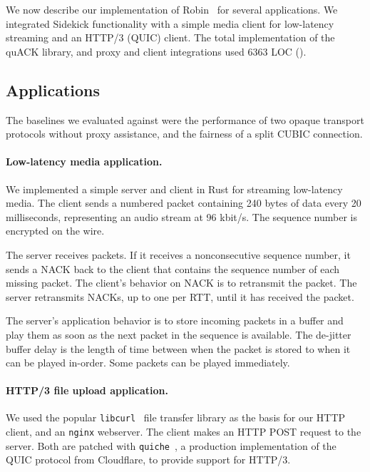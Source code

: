 

We now describe our implementation of Robin~\cite{sidekick-github} for several applications.
We integrated Sidekick functionality with a simple media client for low-latency streaming
and an HTTP/3 (QUIC) client.
The total implementation of the quACK library, and proxy and client
integrations used 6363 LOC ().

\subsection{Applications}
\label{sec:sidekick:implementation:applications}

The baselines we evaluated against were the performance of two opaque transport
protocols without proxy assistance, and the fairness of a split CUBIC connection.

\paragraph{Low-latency media application.}
We implemented a simple server and client in Rust for streaming low-latency
media. The client sends a numbered packet containing 240 bytes of data every
20 milliseconds, representing an audio stream at 96 kbit/s.
The sequence number is encrypted on the wire.

The server receives packets. If it receives a nonconsecutive sequence number,
it sends a NACK back to the client that contains the sequence number of each
missing packet. The client's behavior on NACK is to retransmit the packet. The
server retransmits NACKs, up to one per RTT, until it has received the packet.

The server's application behavior is to store incoming packets in a buffer
and play them as soon as the next packet in the sequence is available. The
de-jitter buffer delay is the length of time between when the packet is stored
to when it can be played in-order. Some packets can be played immediately.

\paragraph{HTTP/3 file upload application.}
We used the popular \texttt{libcurl}~\cite{libcurl} file transfer library as the basis for
our HTTP client, and an \texttt{nginx} webserver. The client makes an HTTP
POST request to the server. Both are patched with \texttt{quiche}~\cite{quiche}, a production
implementation of the QUIC protocol from Cloudflare, to provide support for
HTTP/3.

